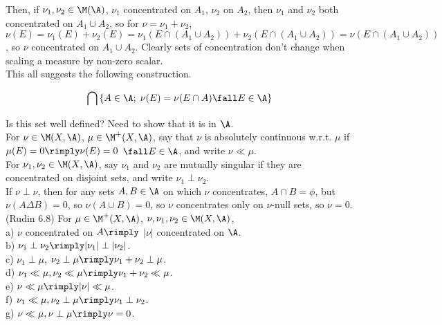 \noindent
Then, if $\nu_1, \nu_2 \in \M(\A)$, $\nu_1$ concentrated on $A_1$, $\nu_2$ on $A_2$, then $\nu_1$ and $\nu_2$ both concentrated on $A_1 \cup A_2$, so for $\nu = \nu_1 + \nu_2$, $\nu(E) = \nu_1(E) + \nu_2(E) = \nu_1(E \cap (A_1 \cup A_2) ) + \nu_2(E \cap (A_1 \cup A_2) ) = \nu(E \cap (A_1 \cup A_2))$, so $\nu$ concentrated on $A_1\cup A_2$. Clearly sets of concentration don't change when scaling a measure by non-zero scalar. \\



\noindent
This all suggests the following construction.

$$
    \bigcap \left\{ A \in \A ; \; \nu(E) = \nu(E \cap A) \fall E \in \A  \right\}
$$

\noindent
Is this set well defined? Need to show that it is in $\A$. \\


For $\nu \in \M(X, \A)$, $\mu \in \M^+(X, \A)$, say that $\nu$ is absolutely continuous w.r.t. $\mu$ if $\mu(E) = 0 \rimply \nu(E) = 0$ $\fall E \in \A$, and write $\nu \ll \mu$. \\

For $\nu_1, \nu_2 \in \M(X, \A)$, say $\nu_1$ and $\nu_2$ are mutually singular if they are concentrated on disjoint sets, and write $\nu_1 \perp \nu_2$. \\

\noindent
If $\nu \perp \nu$, then for any sets $A,B \in \A$ on which $\nu$ concentrates, $A \cap B = \phi$, but $\nu(A \Delta B) = 0$, so $\nu(A \cup B) = 0$, so $\nu$ concentrates only on $\nu$-null sets, so $\nu=0$. \\


(Rudin 6.8) For $\mu \in \M^+(X, \A)$, $\nu,\nu_1,\nu_2 \in \M(X, \A)$, \\

\noindent
a) $\nu$ concentrated on $A \rimply$ $|\nu|$ concentrated on $\A$. \\
b) $\nu_1 \perp \nu_2 \rimply |\nu_1| \perp |\nu_2|$. \\
c) $\nu_1 \perp \mu$, $\nu_2 \perp \mu \rimply \nu_1 + \nu_2 \perp \mu$. \\
d) $\nu_1 \ll \mu, \nu_2 \ll \mu \rimply \nu_1 + \nu_2 \ll \mu$. \\
e) $\nu \ll \mu \rimply |\nu| \ll \mu$. \\
f) $\nu_1 \ll \mu, \nu_2 \perp \mu \rimply \nu_1 \perp \nu_2$. \\
g) $\nu \ll \mu, \nu \perp \mu \rimply \nu = 0$. \\

